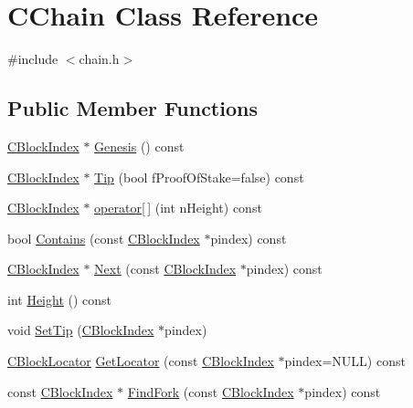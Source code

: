 \hypertarget{class_c_chain}{}\section{C\+Chain Class Reference}
\label{class_c_chain}


{\ttfamily \#include $<$chain.\+h$>$}

\subsection*{Public Member Functions}
\begin{DoxyCompactItemize}
\item 
\mbox{\hyperlink{class_c_block_index}{C\+Block\+Index}} $\ast$ \mbox{\hyperlink{class_c_chain_a0af94042e68f7dbc86260d3a54f08a3f}{Genesis}} () const
\item 
\mbox{\hyperlink{class_c_block_index}{C\+Block\+Index}} $\ast$ \mbox{\hyperlink{class_c_chain_a40ccefec14f8f3195c08c827af8cf412}{Tip}} (bool f\+Proof\+Of\+Stake=false) const
\item 
\mbox{\hyperlink{class_c_block_index}{C\+Block\+Index}} $\ast$ \mbox{\hyperlink{class_c_chain_a13c4493c833ffb8d1725fde05e42b28a}{operator\mbox{[}$\,$\mbox{]}}} (int n\+Height) const
\item 
bool \mbox{\hyperlink{class_c_chain_af1786dc229c215dea7f727c11df2c8dc}{Contains}} (const \mbox{\hyperlink{class_c_block_index}{C\+Block\+Index}} $\ast$pindex) const
\item 
\mbox{\hyperlink{class_c_block_index}{C\+Block\+Index}} $\ast$ \mbox{\hyperlink{class_c_chain_a3077e83c87e8a974765fa76a57fd040b}{Next}} (const \mbox{\hyperlink{class_c_block_index}{C\+Block\+Index}} $\ast$pindex) const
\item 
int \mbox{\hyperlink{class_c_chain_ad4758bc8872ce065a9579f77c3171d40}{Height}} () const
\item 
void \mbox{\hyperlink{class_c_chain_aeb563751f7362d4308c7c2cb35b834a5}{Set\+Tip}} (\mbox{\hyperlink{class_c_block_index}{C\+Block\+Index}} $\ast$pindex)
\item 
\mbox{\hyperlink{struct_c_block_locator}{C\+Block\+Locator}} \mbox{\hyperlink{class_c_chain_a03e98bebe804bfba219b4e6a2b858d9f}{Get\+Locator}} (const \mbox{\hyperlink{class_c_block_index}{C\+Block\+Index}} $\ast$pindex=N\+U\+LL) const
\item 
const \mbox{\hyperlink{class_c_block_index}{C\+Block\+Index}} $\ast$ \mbox{\hyperlink{class_c_chain_adb9ec01329511e869bba95e3c143da71}{Find\+Fork}} (const \mbox{\hyperlink{class_c_block_index}{C\+Block\+Index}} $\ast$pindex) const
\end{DoxyCompactItemize}
